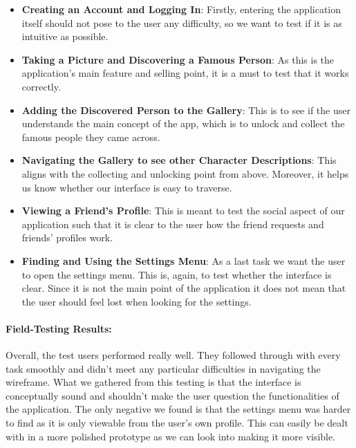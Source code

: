 \documentclass[12pt]{scrartcl}
\begin{document}
	\begin{itemize}
	\item  \textbf{Creating an Account and Logging In}: Firstly, entering the application itself should
	not pose to the user any difficulty, so we want to test if it is as intuitive as possible.
	
	\item \textbf{Taking a Picture and Discovering a Famous Person}: As this is the application's main
	feature and selling point, it is a must to test that it works correctly.
	
	\item \textbf{Adding the Discovered Person to the Gallery}: This is to see if the user
	understands the main concept of the app, which is to unlock and collect the famous people
	they came across.
	
	\item \textbf{Navigating the Gallery to see other Character Descriptions}: This aligns with the
	collecting and unlocking point from above. Moreover, it helps us know whether our interface is
	easy to traverse.
	
	\item \textbf{Viewing a Friend's Profile}: This is meant to test the social aspect of our application
	such that it is clear to the user how the friend requests and friends' profiles work.
	
	\item \textbf{Finding and Using the Settings Menu}: As a last task we want the user to open the
	settings menu. This is, again, to test whether the interface is clear. Since it is not the main point
	of the application it does not mean that the user should feel lost when looking for the settings.
	\end{itemize}
	
	\paragraph{\large Field-Testing Results:}
	
	Overall, the test users performed really well. They followed through with every task smoothly and
	didn't meet any particular difficulties in navigating the wireframe. What we gathered from this
	testing is that the interface is conceptually sound and shouldn't make the user question the
	functionalities of the application. The only negative we found is that the settings menu was harder
	to find as it is only viewable from the user's own profile. This can easily be dealt with in a more
	polished prototype as we can look into making it more visible.
\end{document}
